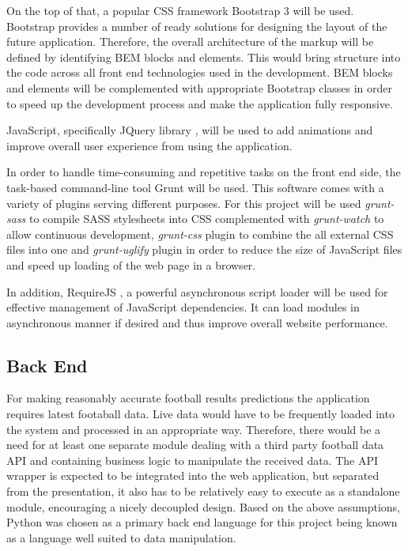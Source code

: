 On the top of that, a popular CSS framework Bootstrap 3 \cite{bootstrap} will be used. Bootstrap provides a number of ready solutions for designing the layout of the future application. Therefore, the overall architecture of the markup will be defined by identifying BEM blocks and elements. This would bring structure into the code across all front end technologies used in the development. BEM blocks and elements will be complemented with appropriate Bootstrap classes in order to speed up the development process and make the application fully responsive.
 
JavaScript, specifically JQuery library \cite{jquery}, will be used to add animations and improve overall user experience from using the application.  

In order to handle time-consuming and repetitive tasks on the front end side, the task-based command-line tool Grunt will be used. This software comes with a variety of plugins serving different purposes. For this project will be used \emph{grunt-sass} to compile SASS stylesheets into CSS complemented with \emph{grunt-watch} to allow continuous development, \emph{grunt-css} plugin to combine the all external CSS files into one and \emph{grunt-uglify} plugin in order to reduce the size of JavaScript files and speed up loading of the web page in a browser. 
	
In addition, RequireJS \cite{requirejs}, a powerful asynchronous script loader will be used for effective management of JavaScript dependencies. It can load modules in asynchronous manner if desired and thus improve overall website performance.

\subsection{Back End}
For making reasonably accurate football results predictions the application requires latest footaball data. Live data would have to be frequently loaded into the system and processed in an appropriate way. Therefore, there would be a need for at least one separate module dealing with a third party football data API and containing business logic to manipulate the received data. The API wrapper is expected to be integrated into the web application, but separated from the presentation, it also has to be relatively easy to execute as a standalone module, encouraging a nicely decoupled design. Based on the above assumptions, Python was chosen as a primary back end language for this project being known as a language well suited to data manipulation.

